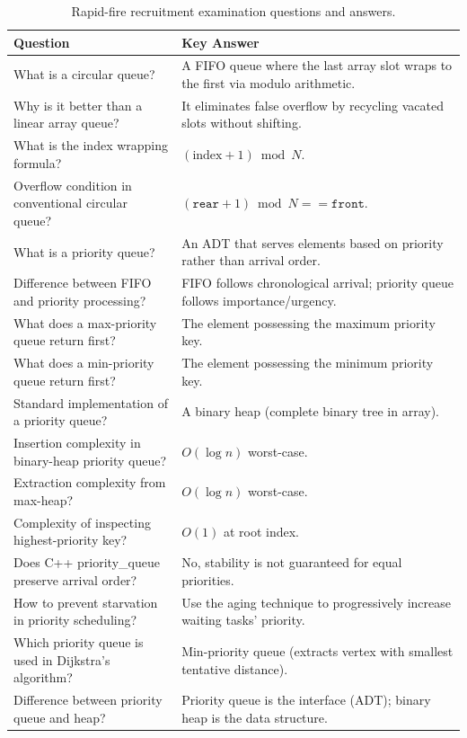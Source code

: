 \begin{table}[htbp]
\centering
\small
\begin{tabularx}{\textwidth}{p{7cm} X}
\toprule
\textbf{Question} & \textbf{Key Answer} \\
\midrule
What is a circular queue? & A FIFO queue where the last array slot wraps to the first via modulo arithmetic. \\
Why is it better than a linear array queue? & It eliminates false overflow by recycling vacated slots without shifting. \\
What is the index wrapping formula? & $(\text{index} + 1) \bmod N$. \\
Overflow condition in conventional circular queue? & $(\texttt{rear} + 1) \bmod N == \texttt{front}$. \\
What is a priority queue? & An ADT that serves elements based on priority rather than arrival order. \\
Difference between FIFO and priority processing? & FIFO follows chronological arrival; priority queue follows importance/urgency. \\
What does a max-priority queue return first? & The element possessing the maximum priority key. \\
What does a min-priority queue return first? & The element possessing the minimum priority key. \\
Standard implementation of a priority queue? & A binary heap (complete binary tree in array). \\
Insertion complexity in binary-heap priority queue? & $O(\log n)$ worst-case. \\
Extraction complexity from max-heap? & $O(\log n)$ worst-case. \\
Complexity of inspecting highest-priority key? & $O(1)$ at root index. \\
Does C++ priority\_queue preserve arrival order? & No, stability is not guaranteed for equal priorities. \\
How to prevent starvation in priority scheduling? & Use the aging technique to progressively increase waiting tasks' priority. \\
Which priority queue is used in Dijkstra's algorithm? & Min-priority queue (extracts vertex with smallest tentative distance). \\
Difference between priority queue and heap? & Priority queue is the interface (ADT); binary heap is the data structure. \\
\bottomrule
\end{tabularx}
\caption{Rapid-fire recruitment examination questions and answers.}
\end{table}

